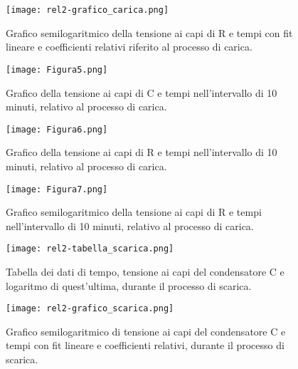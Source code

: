 \documentclass{article}
\begin{document}
\begin{figure}
    \centering
    \texttt{[image: rel2-grafico\_carica.png]}
    \caption{Grafico semilogaritmico della tensione ai capi di R e tempi con fit lineare e coefficienti relativi riferito al processo di carica.}
    \label{figura4}
\end{figure}

\begin{figure}
    \centering
    \texttt{[image: Figura5.png]}
    \caption{Grafico della tensione ai capi di C e tempi nell’intervallo di 10 minuti, relativo al processo di carica.}
    \label{figura5}
\end{figure}

\begin{figure}
    \centering
    \texttt{[image: Figura6.png]}
    \caption{Grafico della tensione ai capi di R e tempi nell’intervallo di 10 minuti, relativo al processo di carica.}
    \label{figura6}
\end{figure}

\begin{figure}
    \centering
    \texttt{[image: Figura7.png]}
    \caption{Grafico semilogaritmico della tensione ai capi di R e tempi nell’intervallo di 10 minuti, relativo al processo di carica.}
    \label{figura7}
\end{figure}

\begin{figure}
    \centering
    \texttt{[image: rel2-tabella\_scarica.png]}
    \caption{Tabella dei dati di tempo, tensione ai capi del condensatore C e logaritmo di quest’ultima, durante il processo di scarica.}
    \label{figura8}
\end{figure}

\begin{figure}
    \centering
    \texttt{[image: rel2-grafico\_scarica.png]}
    \caption{Grafico semilogaritmico di tensione ai capi del condensatore C e tempi con fit lineare e coefficienti relativi, durante il processo di scarica.}
    \label{figura9}
\end{figure}
\end{document}
